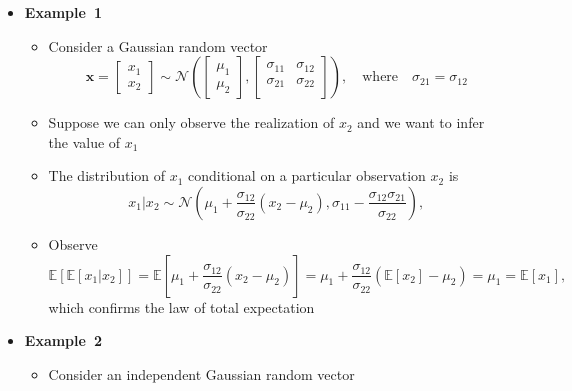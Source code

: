 \documentclass[12pt,a4paper]{article}
\begin{document}
\begin{itemize}
\item \textbf{Example~1}
  \begin{itemize}
  \item Consider a Gaussian random vector
    \begin{equation}\nonumber%
      \bm{x}
      =
      \begin{bmatrix}
        x_{1} \\ x_{2}
      \end{bmatrix}
      \sim \mathcal{N} \left(
        \begin{bmatrix}
          \mu_{1} \\ \mu_{2}
        \end{bmatrix},
        \begin{bmatrix}
          \sigma_{11} & \sigma_{12} \\
          \sigma_{21} & \sigma_{22} \\
        \end{bmatrix}
      \right),
      \quad\text{where}\quad \sigma_{21} = \sigma_{12}
    \end{equation}
  \item Suppose we can only observe the realization of $x_{2}$
    and we want to infer the value of $x_{1}$
  \item The distribution of $x_{1}$ conditional on a particular observation $x_{2}$ is
    \begin{equation}\nonumber%
      x_{1}|x_{2} \sim
      \mathcal{N}\left(
        \mu_{1} + \frac{\sigma_{12}}{\sigma_{22}}(x_{2}-\mu_{2}),
        \sigma_{11} - \frac{\sigma_{12}\sigma_{21}}{\sigma_{22}}
      \right),
    \end{equation}
  \item Observe
    \begin{equation}\nonumber%
      \mathbb{E}\left[\mathbb{E}\left[x_{1}|x_{2}\right]\right]
      =
      \mathbb{E}\left[\mu_{1} + \frac{\sigma_{12}}{\sigma_{22}}(x_{2}-\mu_{2})\right]
      =
      \mu_{1} + \frac{\sigma_{12}}{\sigma_{22}}(\mathbb{E}\left[x_{2}\right]-\mu_{2})
      =
      \mu_{1}
      =
      \mathbb{E}[x_{1}],
    \end{equation}
    which confirms the law of total expectation
  \end{itemize}
\item \textbf{Example~2}
  \begin{itemize}
  \item Consider an independent Gaussian random vector
    \begin{equation}\nonumber%

\end{equation}
\end{itemize}
\end{itemize}
\end{document}
